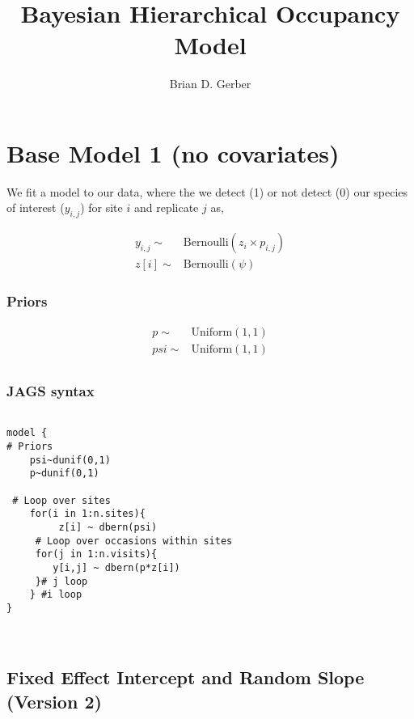 \documentclass[12pt]{article}
\title{Bayesian Hierarchical Occupancy Model}
\author{Brian D. Gerber}
\begin{document}
\maketitle
\section{Base Model 1 (no covariates)}

\Large

We fit a model to our data, where the we detect (1) or not detect (0) our species of interest ($y_{i,j}$) for site $i$ and replicate $j$ as,

\begin{align*}
y_{i,j}\sim& \text{Bernoulli}(z_{i} \times p_{i,j})\\
z[i] \sim&  \text{Bernoulli}(\psi)
\end{align*}

\subsubsection{Priors}

\begin{align*}
p \sim& \text{Uniform}(1, 1)\\
psi \sim& \text{Uniform}(1, 1)\\
\end{align*}


\pagebreak

\subsubsection{JAGS syntax}

\begin{verbatim}

model {
# Priors
	psi~dunif(0,1)
	p~dunif(0,1)
	
 # Loop over sites	
	for(i in 1:n.sites){
	     z[i] ~ dbern(psi)
	 # Loop over occasions within sites			
	 for(j in 1:n.visits){
		y[i,j] ~ dbern(p*z[i])
	 }# j loop
	} #i loop
}



\end{verbatim}





\subsection{Fixed Effect Intercept and Random Slope (Version 2)}
\end{document}
